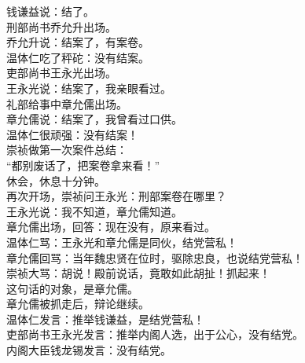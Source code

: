 \begin{multicols}{\theparacolNo}
钱谦益说：结了。\\

刑部尚书乔允升出场。\\

乔允升说：结案了，有案卷。\\

温体仁吃了秤砣：没有结案。\\

吏部尚书王永光出场。\\

王永光说：结案了，我亲眼看过。\\

礼部给事中章允儒出场。\\

章允儒说：结案了，我曾看过口供。\\

温体仁很顽强：没有结案！\\

崇祯做第一次案件总结：\\

“都别废话了，把案卷拿来看！”\\

休会，休息十分钟。\\

再次开场，崇祯问王永光：刑部案卷在哪里？\\

王永光说：我不知道，章允儒知道。\\

章允儒出场，回答：现在没有，原来看过。\\

温体仁骂：王永光和章允儒是同伙，结党营私！\\

章允儒回骂：当年魏忠贤在位时，驱除忠良，也说结党营私！\\

崇祯大骂：胡说！殿前说话，竟敢如此胡扯！抓起来！\\

这句话的对象，是章允儒。\\

章允儒被抓走后，辩论继续。\\

温体仁发言：推举钱谦益，是结党营私！\\

吏部尚书王永光发言：推举内阁人选，出于公心，没有结党。\\

内阁大臣钱龙锡发言：没有结党。\\


\end{multicols}
